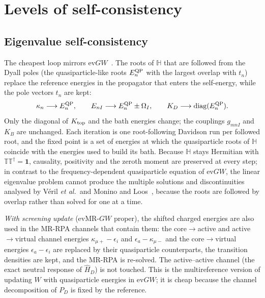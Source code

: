 \documentclass[11pt,a4paper]{article}
\newcommand{\bbH}{\mathbb{H}}
\newcommand{\bbT}{\mathbb{T}}
\newcommand{\GW}{$GW$}
\newcommand{\MRGW}{MR-$GW$}
\begin{document}
\section{Levels of self-consistency}
\label{sec:levels}

\subsection{Eigenvalue self-consistency}
\label{sec:ev}

The cheapest loop mirrors ev\GW{}~\cite{ShishkinKresse2007,Blase2011}.  The
roots of $\bbH$ that are followed from the Dyall poles (the quasiparticle-like
roots $E_n^{\rm QP}$ with the largest overlap with $t_n$) replace the
reference energies in the propagator that enters the self-energy, while the
pole vectors $t_n$ are kept:
\begin{equation}
  \kappa_n\longrightarrow E_n^{\rm QP},\qquad
  E_{nI}\longrightarrow E_n^{\rm QP}\pm\Omega_I,\qquad
  K_D\longrightarrow\operatorname{diag}(E_n^{\rm QP}) .
  \label{eq:ev}
\end{equation}
Only the diagonal of $K_{\rm top}$ and the bath energies change; the
couplings $g_{mnI}$ and $K_B$ are unchanged.  Each iteration is one
root-following Davidson run per followed root, and the fixed point is a set
of energies at which the quasiparticle roots of $\bbH$ coincide with the
energies used to build its bath.  Because $\bbH$ stays Hermitian with
$\bbT\bbT^\dagger=\mathbf 1$, causality, positivity and the zeroth moment are
preserved at every step; in contrast to the frequency-dependent
quasiparticle equation of ev\GW{}, the linear eigenvalue problem cannot
produce the multiple solutions and discontinuities analysed by V\'eril
\emph{et al.}\ and Monino and Loos~\cite{Veril2018,MoninoLoos2022}, because
the roots are followed by overlap rather than solved for one at a time.

\emph{With screening update} (ev\MRGW{} proper), the shifted charged energies
are also used in the MR-RPA channels that contain them: the core$\to$active
and active$\to$virtual channel energies $\kappa_{\mu+}-\epsilon_i$ and
$\epsilon_a-\kappa_{\mu-}$ and the core$\to$virtual energies
$\epsilon_a-\epsilon_i$ are replaced by their quasiparticle counterparts,
the transition densities are kept, and the MR-RPA is re-solved.  The
active--active channel (the exact neutral response of $\hat H_D$) is not
touched.  This is the multireference version of updating $W$ with
quasiparticle energies in ev\GW{}; it is cheap because the channel
decomposition of $P_D$ is fixed by the reference.
\end{document}
